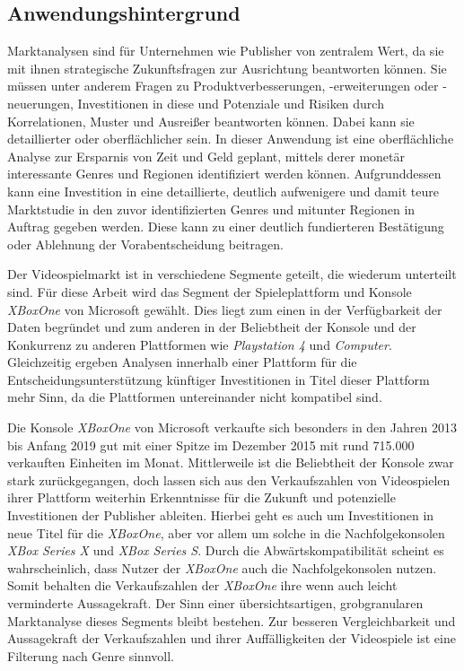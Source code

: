 \documentclass[usegeometry=true]{scrartcl}
\begin{document}
\subsection{Anwendungshintergrund}
Marktanalysen sind für Unternehmen wie Publisher von zentralem Wert, da sie mit ihnen strategische Zukunftsfragen zur Ausrichtung beantworten können. 
Sie müssen unter anderem Fragen zu Produktverbesserungen, -erweiterungen oder -neuerungen, Investitionen in diese und Potenziale und Risiken durch Korrelationen, Muster und Ausreißer beantworten können.\cite{Fleig.2020}
Dabei kann sie detaillierter oder oberflächlicher sein. 
In dieser Anwendung ist eine oberflächliche Analyse zur Ersparnis von Zeit und Geld geplant, mittels derer monetär interessante Genres und Regionen identifiziert werden können.
Aufgrunddessen kann eine Investition in eine detaillierte, deutlich aufwenigere und damit teure Marktstudie in den zuvor identifizierten Genres und mitunter Regionen in Auftrag gegeben werden. 
Diese kann zu einer deutlich fundierteren Bestätigung oder Ablehnung der Vorabentscheidung beitragen.

Der Videospielmarkt ist in verschiedene Segmente geteilt, die wiederum unterteilt sind. 
Für diese Arbeit wird das Segment der Spieleplattform und Konsole \textit{XBoxOne} von Microsoft gewählt.
Dies liegt zum einen in der Verfügbarkeit der Daten begründet und zum anderen in der Beliebtheit der Konsole und der Konkurrenz zu anderen Plattformen wie \textit{Playstation 4} und \textit{Computer}.
Gleichzeitig ergeben Analysen innerhalb einer Plattform für die Entscheidungsunterstützung künftiger Investitionen in Titel dieser Plattform mehr Sinn, da die Plattformen untereinander nicht kompatibel sind.

Die Konsole \textit{XBoxOne} von Microsoft verkaufte sich besonders in den Jahren 2013 bis Anfang 2019 gut mit einer Spitze im Dezember 2015 mit rund 715.000 verkauften Einheiten im Monat.
Mittlerweile ist die Beliebtheit der Konsole zwar stark zurückgegangen, doch lassen sich aus den Verkaufszahlen von Videospielen ihrer Plattform weiterhin Erkenntnisse für die Zukunft und potenzielle Investitionen der Publisher ableiten.\cite{Statista.2022}
Hierbei geht es auch um Investitionen in neue Titel für die \textit{XBoxOne}, aber vor allem um solche in die Nachfolgekonsolen \textit{XBox Series X} und \textit{XBox Series S}. 
Durch die Abwärtskompatibilität scheint es wahrscheinlich, dass Nutzer der \textit{XBoxOne} auch die Nachfolgekonsolen nutzen.\cite{GamesWirtschaft.2021} 
Somit behalten die Verkaufszahlen der \textit{XBoxOne} ihre wenn auch leicht verminderte Aussagekraft.
Der Sinn einer übersichtsartigen, grobgranularen Marktanalyse dieses Segments bleibt bestehen.
Zur besseren Vergleichbarkeit und Aussagekraft der Verkaufszahlen und ihrer Auffälligkeiten der Videospiele ist eine Filterung nach Genre sinnvoll.
\end{document}
